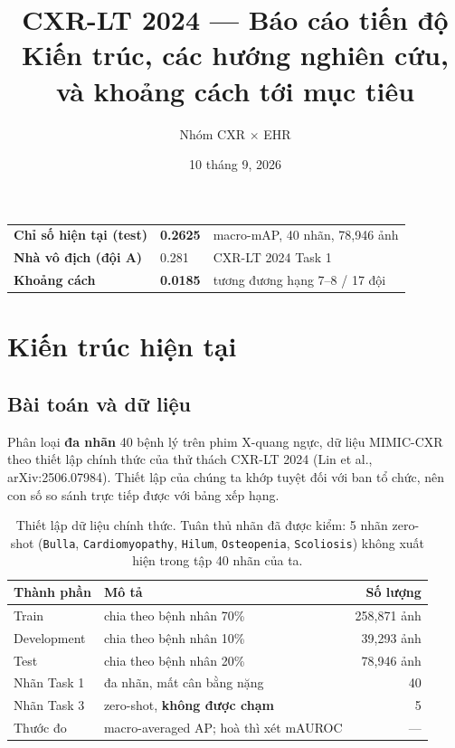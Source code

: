\documentclass[11pt,a4paper]{article}
\title{\textbf{CXR-LT 2024 — Báo cáo tiến độ}\\[2mm]
       \large Kiến trúc, các hướng nghiên cứu, và khoảng cách tới mục tiêu}
\author{Nhóm CXR $\times$ EHR}
\date{10 tháng 9, 2026}
\newcommand{\code}[1]{\texttt{\small #1}}
\begin{document}
\maketitle

\begin{center}
\begin{tabular}{@{}lll@{}}
\toprule
\textbf{Chỉ số hiện tại (test)} & \textbf{0.2625} & macro-mAP, 40 nhãn, 78{,}946 ảnh \\
\textbf{Nhà vô địch (đội A)} & 0.281 & CXR-LT 2024 Task 1 \\
\textbf{Khoảng cách} & \textbf{0.0185} & tương đương hạng 7--8 / 17 đội \\
\bottomrule
\end{tabular}
\end{center}

\vspace{2mm}


\section{Kiến trúc hiện tại}

\subsection{Bài toán và dữ liệu}

Phân loại \textbf{đa nhãn} 40 bệnh lý trên phim X-quang ngực, dữ liệu MIMIC-CXR theo
thiết lập chính thức của thử thách CXR-LT 2024 (Lin et al., arXiv:2506.07984). Thiết
lập của chúng ta khớp tuyệt đối với ban tổ chức, nên con số so sánh trực tiếp được
với bảng xếp hạng.

\begin{table}[h]
\centering
\small
\begin{tabular}{@{}llr@{}}
\toprule
\textbf{Thành phần} & \textbf{Mô tả} & \textbf{Số lượng} \\
\midrule
Train        & chia theo bệnh nhân 70\%          & 258{,}871 ảnh \\
Development  & chia theo bệnh nhân 10\%          & 39{,}293 ảnh \\
Test         & chia theo bệnh nhân 20\%          & 78{,}946 ảnh \\
Nhãn Task 1  & đa nhãn, mất cân bằng nặng        & 40 \\
Nhãn Task 3  & zero-shot, \textbf{không được chạm} & 5 \\
Thước đo     & macro-averaged AP; hoà thì xét mAUROC & --- \\
\bottomrule
\end{tabular}
\caption{Thiết lập dữ liệu chính thức. Tuân thủ nhãn đã được kiểm: 5 nhãn zero-shot
(\code{Bulla}, \code{Cardiomyopathy}, \code{Hilum}, \code{Osteopenia}, \code{Scoliosis})
không xuất hiện trong tập 40 nhãn của ta.}
\end{table}
\end{document}
